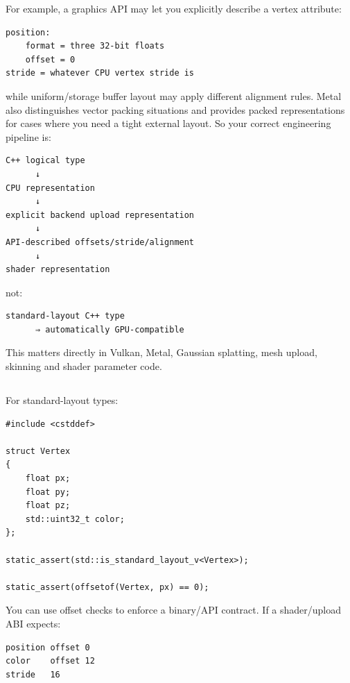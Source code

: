 For example, a graphics API may let you explicitly describe a vertex attribute:

\begin{verbatim}
position:
    format = three 32-bit floats
    offset = 0
stride = whatever CPU vertex stride is
\end{verbatim}

while uniform/storage buffer layout may apply different alignment rules. Metal also distinguishes vector packing situations and provides packed representations for cases where you need a tight external layout. So your correct engineering pipeline is:

\begin{verbatim}
C++ logical type
      ↓
CPU representation
      ↓
explicit backend upload representation
      ↓
API-described offsets/stride/alignment
      ↓
shader representation
\end{verbatim}

not:

\begin{verbatim}
standard-layout C++ type
      ⇒ automatically GPU-compatible
\end{verbatim}

This matters directly in Vulkan, Metal, Gaussian splatting, mesh upload, skinning and shader parameter code.

\subsection{\texorpdfstring{}{offsetof}}\label{01-foundations-i-ch003-offsetof}

\hypertarget{01-foundations-i-ch003-offsetof}{}

For standard-layout types:

\begin{verbatim}
#include <cstddef>

struct Vertex
{
    float px;
    float py;
    float pz;
    std::uint32_t color;
};

static_assert(std::is_standard_layout_v<Vertex>);

static_assert(offsetof(Vertex, px) == 0);
\end{verbatim}

You can use offset checks to enforce a binary/API contract. If a shader/upload ABI expects:

\begin{verbatim}
position offset 0
color    offset 12
stride   16
\end{verbatim}


